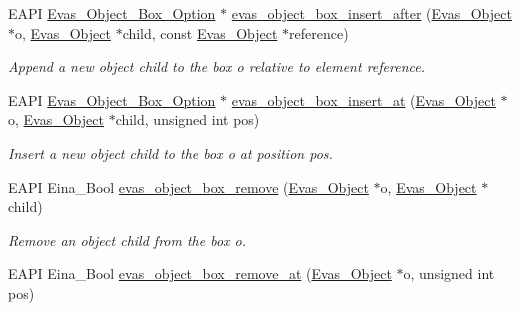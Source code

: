 \begin{DoxyCompactItemize}
EAPI \hyperlink{group__Evas__Object__Box_gabbeb05bf47aaf7681e9d83a1b0055d20}{Evas\_\-Object\_\-Box\_\-Option} $\ast$ \hyperlink{group__Evas__Object__Box_ga9b1fc7ee0200ce3917da70b00fb8637c}{evas\_\-object\_\-box\_\-insert\_\-after} (\hyperlink{group__Evas__Object__Group_ga9e19e6dd1f517a0ba437c0114d3e7c97}{Evas\_\-Object} $\ast$o, \hyperlink{group__Evas__Object__Group_ga9e19e6dd1f517a0ba437c0114d3e7c97}{Evas\_\-Object} $\ast$child, const \hyperlink{group__Evas__Object__Group_ga9e19e6dd1f517a0ba437c0114d3e7c97}{Evas\_\-Object} $\ast$reference)
\begin{DoxyCompactList}\small\item\em Append a new object {\itshape child\/} to the box {\ttfamily o} relative to element {\itshape reference\/}. \item\end{DoxyCompactList}\item 
EAPI \hyperlink{group__Evas__Object__Box_gabbeb05bf47aaf7681e9d83a1b0055d20}{Evas\_\-Object\_\-Box\_\-Option} $\ast$ \hyperlink{group__Evas__Object__Box_ga01b2f0564057297d6853844b77fba3a6}{evas\_\-object\_\-box\_\-insert\_\-at} (\hyperlink{group__Evas__Object__Group_ga9e19e6dd1f517a0ba437c0114d3e7c97}{Evas\_\-Object} $\ast$o, \hyperlink{group__Evas__Object__Group_ga9e19e6dd1f517a0ba437c0114d3e7c97}{Evas\_\-Object} $\ast$child, unsigned int pos)
\begin{DoxyCompactList}\small\item\em Insert a new object {\itshape child\/} to the box {\itshape o\/} at position {\itshape pos\/}. \item\end{DoxyCompactList}\item 
EAPI Eina\_\-Bool \hyperlink{group__Evas__Object__Box_ga90c644be44c06e2e4f966cb14b7a93a5}{evas\_\-object\_\-box\_\-remove} (\hyperlink{group__Evas__Object__Group_ga9e19e6dd1f517a0ba437c0114d3e7c97}{Evas\_\-Object} $\ast$o, \hyperlink{group__Evas__Object__Group_ga9e19e6dd1f517a0ba437c0114d3e7c97}{Evas\_\-Object} $\ast$child)
\begin{DoxyCompactList}\small\item\em Remove an object {\itshape child\/} from the box {\itshape o\/}. \item\end{DoxyCompactList}\item 
EAPI Eina\_\-Bool \hyperlink{group__Evas__Object__Box_ga7d6a7321327f1398790d1f12cccd38f3}{evas\_\-object\_\-box\_\-remove\_\-at} (\hyperlink{group__Evas__Object__Group_ga9e19e6dd1f517a0ba437c0114d3e7c97}{Evas\_\-Object} $\ast$o, unsigned int pos)

\end{DoxyCompactItemize}
